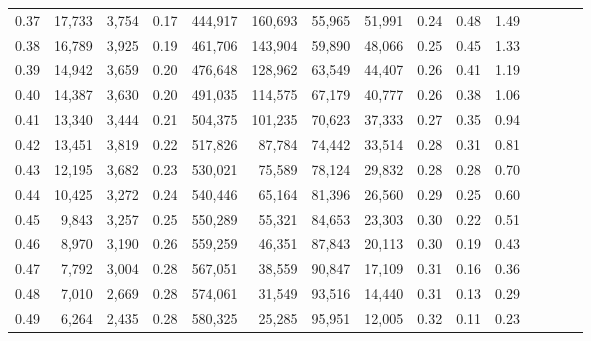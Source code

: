\begin{tabular}{rrrcrrrrrrrrrrr}
0.37 &  17,733 &  3,754 &                                       0.17 &  444,917 &  160,693 &   55,965 &   51,991 &  0.24 &  0.48 &                         1.49 \\
0.38 &  16,789 &  3,925 &                                       0.19 &  461,706 &  143,904 &   59,890 &   48,066 &  0.25 &  0.45 &                         1.33 \\
0.39 &  14,942 &  3,659 &                                       0.20 &  476,648 &  128,962 &   63,549 &   44,407 &  0.26 &  0.41 &                         1.19 \\
0.40 &  14,387 &  3,630 &                                       0.20 &  491,035 &  114,575 &   67,179 &   40,777 &  0.26 &  0.38 &                         1.06 \\
0.41 &  13,340 &  3,444 &                                       0.21 &  504,375 &  101,235 &   70,623 &   37,333 &  0.27 &  0.35 &                         0.94 \\
0.42 &  13,451 &  3,819 &                                       0.22 &  517,826 &   87,784 &   74,442 &   33,514 &  0.28 &  0.31 &                         0.81 \\
0.43 &  12,195 &  3,682 &                                       0.23 &  530,021 &   75,589 &   78,124 &   29,832 &  0.28 &  0.28 &                         0.70 \\
0.44 &  10,425 &  3,272 &                                       0.24 &  540,446 &   65,164 &   81,396 &   26,560 &  0.29 &  0.25 &                         0.60 \\
0.45 &   9,843 &  3,257 &                                       0.25 &  550,289 &   55,321 &   84,653 &   23,303 &  0.30 &  0.22 &                         0.51 \\
0.46 &   8,970 &  3,190 &                                       0.26 &  559,259 &   46,351 &   87,843 &   20,113 &  0.30 &  0.19 &                         0.43 \\
0.47 &   7,792 &  3,004 &                                       0.28 &  567,051 &   38,559 &   90,847 &   17,109 &  0.31 &  0.16 &                         0.36 \\
0.48 &   7,010 &  2,669 &                                       0.28 &  574,061 &   31,549 &   93,516 &   14,440 &  0.31 &  0.13 &                         0.29 \\
0.49 &   6,264 &  2,435 &                                       0.28 &  580,325 &   25,285 &   95,951 &   12,005 &  0.32 &  0.11 &                         0.23 \\

\end{tabular}
